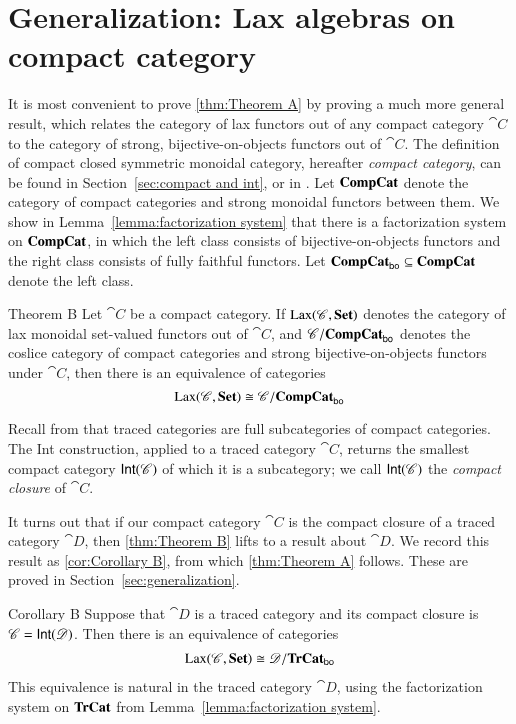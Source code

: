 \documentclass[12pt,oneside,article,draft]{memoir}
\begin{document}
\section{Generalization: Lax algebras on compact category}

It is most convenient to prove \ref{thm:Theorem A} by proving a much more general result, which relates the category of lax functors out of any compact category $\cat{C}$ to the category of strong, bijective-on-objects functors out of $\cat{C}$. The definition of compact closed symmetric monoidal category, hereafter \emph{compact category}, can be found in Section~\ref{sec:compact and int}, or in \cite{}. Let $\mathbf{CompCat}$ denote the category of compact categories and strong monoidal functors between them. We show in Lemma~\ref{lemma:factorization system} that there is a factorization system on $\mathbf{CompCat}$, in which the left class consists of bijective-on-objects functors and the right class consists of fully faithful functors. Let $\mathbf{CompCat}_{\mathsf{bo}}\subseteq\mathbf{CompCat}$ denote the left class. 

\begin{named}{Theorem B}
 Let $\cat{C}$ be a compact category. If $\operatorname{Lax}(\mathscr{C},\mathbf{Set})$ denotes the category of lax monoidal set-valued functors out of $\cat{C}$, and $\mathscr{C}/\mathbf{CompCat}_{\mathsf{bo}}$ denotes the coslice category of compact categories and strong bijective-on-objects functors under $\cat{C}$, then there is an equivalence of categories
\begin{equation}\label{dia:compact lax strong}
  \operatorname{Lax}(\mathscr{C},\mathbf{Set})\cong\mathscr{C}/\mathbf{CompCat}_{\mathsf{bo}}
\end{equation}
\end{named}


Recall from \cite{JoyalStreetVerity} that traced categories are full subcategories of compact categories. The Int construction, applied to a traced category $\cat{C}$, returns the smallest compact category $\mathsf{Int}(\mathscr{C})$ of which it is a subcategory; we call $\mathsf{Int}(\mathscr{C})$ the \emph{compact closure} of $\cat{C}$. 

It turns out that if our compact category $\cat{C}$ is the compact closure of a traced category $\cat{D}$, then \ref{thm:Theorem B} lifts to a result about $\cat{D}$. We record this result as \ref{cor:Corollary B}, from which \ref{thm:Theorem A} follows. These are proved in Section~\ref{sec:generalization}. 

\begin{named}{Corollary B}
Suppose that $\cat{D}$ is a traced category and its compact closure is $\mathscr{C}=\mathsf{Int}(\mathscr{D})$. Then there is an equivalence of categories
\begin{align}\label{dia:traced lax strong}
\operatorname{Lax}(\mathscr{C},\mathbf{Set})\cong\mathscr{D}/\mathbf{TrCat}_{\mathsf{bo}}
\end{align}
This equivalence is natural in the traced category $\cat{D}$, using the factorization system on $\mathbf{TrCat}$ from Lemma~\ref{lemma:factorization system}.
\end{named}
\end{document}
